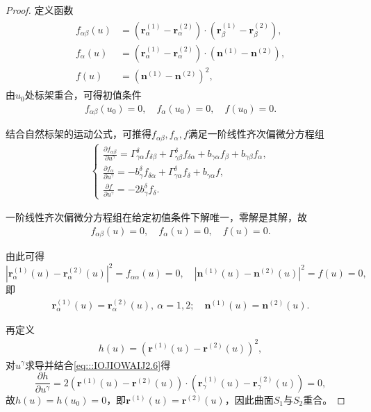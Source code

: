 \documentclass[../../main.tex]{subfiles}%
\begin{document}
\begin{proof}
定义函数
\begin{align}
\begin{split}
f_{\alpha\beta}(u) &= (\boldsymbol{r}_\alpha^{(1)} - \boldsymbol{r}_\alpha^{(2)}) \cdot (\boldsymbol{r}_\beta^{(1)} - \boldsymbol{r}_\beta^{(2)}),\\
f_\alpha(u) &= (\boldsymbol{r}_\alpha^{(1)} - \boldsymbol{r}_\alpha^{(2)}) \cdot (\boldsymbol{n}^{(1)} - \boldsymbol{n}^{(2)}),\\
f(u) &= (\boldsymbol{n}^{(1)} - \boldsymbol{n}^{(2)})^2,
\end{split}
\label{eq:::IOJIOWAIJ2.2}
\end{align}
由$u_0$处标架重合，可得初值条件
\begin{align}
f_{\alpha\beta}(u_0) = 0,\quad f_\alpha(u_0) = 0,\quad f(u_0) = 0.
\label{eq:::IOJIOWAIJ2.3}
\end{align}

结合自然标架的运动公式，可推得$f_{\alpha\beta},f_\alpha,f$满足一阶线性齐次偏微分方程组
\begin{align}
\begin{cases}
\displaystyle\frac{\partial f_{\alpha\beta}}{\partial u^\gamma} = \Gamma_{\gamma\alpha}^\delta f_{\delta\beta} + \Gamma_{\gamma\beta}^\delta f_{\delta\alpha} + b_{\gamma\alpha}f_\beta + b_{\gamma\beta}f_\alpha,\\[6pt]
\displaystyle\frac{\partial f_\alpha}{\partial u^\gamma} = -b_\gamma^\delta f_{\delta\alpha} + \Gamma_{\gamma\alpha}^\delta f_\delta + b_{\gamma\alpha}f,\\[6pt]
\displaystyle\frac{\partial f}{\partial u^\gamma} = -2b_\gamma^\delta f_\delta.
\end{cases}
\label{eq:::IOJIOWAIJ2.4}
\end{align}

一阶线性齐次偏微分方程组在给定初值条件下解唯一，零解是其解，故
\begin{align}
f_{\alpha\beta}(u) = 0,\quad f_\alpha(u) = 0,\quad f(u) = 0.
\label{eq:::IOJIOWAIJ2.5}
\end{align}

由此可得
$$|\boldsymbol{r}_\alpha^{(1)}(u) - \boldsymbol{r}_\alpha^{(2)}(u)|^2 = f_{\alpha\alpha}(u) = 0,\quad |\boldsymbol{n}^{(1)}(u) - \boldsymbol{n}^{(2)}(u)|^2 = f(u) = 0,$$
即
\begin{align}
\boldsymbol{r}_\alpha^{(1)}(u) = \boldsymbol{r}_\alpha^{(2)}(u),\ \alpha=1,2;\quad \boldsymbol{n}^{(1)}(u) = \boldsymbol{n}^{(2)}(u).
\label{eq:::IOJIOWAIJ2.6}
\end{align}

再定义
\begin{align}
h(u) = (\boldsymbol{r}^{(1)}(u) - \boldsymbol{r}^{(2)}(u))^2,
\label{eq:::IOJIOWAIJ2.7}
\end{align}
对$u^\gamma$求导并结合\eqref{eq:::IOJIOWAIJ2.6}得
$$\frac{\partial h}{\partial u^\gamma} = 2(\boldsymbol{r}^{(1)}(u) - \boldsymbol{r}^{(2)}(u)) \cdot (\boldsymbol{r}_\gamma^{(1)}(u) - \boldsymbol{r}_\gamma^{(2)}(u)) = 0,$$
故$h(u)=h(u_0)=0$，即$\boldsymbol{r}^{(1)}(u)=\boldsymbol{r}^{(2)}(u)$，因此曲面$S_1$与$S_2$重合。
\end{proof}
\end{document}

